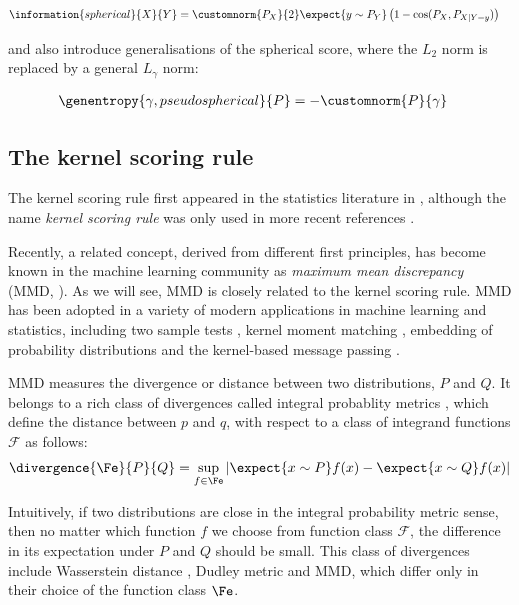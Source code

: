 \begin{align}
	\information{spherical}{X}{Y} &= \customnorm{P_X}{2}\expect{y \sim P_{Y}} \left( 1 - \cos(P_X,P_{X\vert Y=y}) \right)
\end{align}

\citet{Gneiting2007} and \citet{Jose2008} also introduce generalisations of the spherical score, where the $L_2$ norm is replaced by a general $L_\gamma$ norm:

\begin{align}
	\genentropy{\gamma,pseudospherical}{P} &= -\customnorm{P}{\gamma}
\end{align}

\subsection{The kernel scoring rule}

The kernel scoring rule first appeared in the statistics literature in \citep{Eaton1996}, although the name \emph{kernel scoring rule} was only used in more recent references \citep{Dawid1999,Dawid2007,Gneiting2007}.

Recently, a related concept, derived from different first principles, has become known in the machine learning community as \emph{maximum mean discrepancy} (MMD, \citep{Sriperumbudur2008}). As we will see, MMD is closely related to the kernel scoring rule. MMD has been adopted in a variety of modern applications in machine learning and statistics, including two sample tests \citep{Gretton2012}, kernel moment matching \citep{Song2008}, embedding of probability distributions\citep{Smola2007} and the kernel-based message passing \citep{Fukumizu2010}.

MMD measures the divergence or distance between two distributions, $P$ and $Q$. It belongs to a rich class of divergences called integral probablity metrics \citep{Sriperumbudur2009}, which define the distance between  $p$ and $q$, with respect to a class of integrand functions $\mathcal{F}$ as follows:
%
\begin{align}
	\divergence{\Fe}{P}{Q} = \sup_{f\in\Fe}\left\vert \expect{x\sim P} f(x) - \expect{x\sim Q} f(x) \right\vert
\end{align}
	
Intuitively, if two distributions are close in the integral probability metric sense, then no matter which function $f$ we choose from function class $\mathcal{F}$, the difference in its expectation under $P$ and $Q$ should be small. This class of divergences include Wasserstein distance \citep{Barrio1999}, Dudley metric \citep{Dudley1974} and MMD, which differ only in their choice of the function class $\Fe$.

